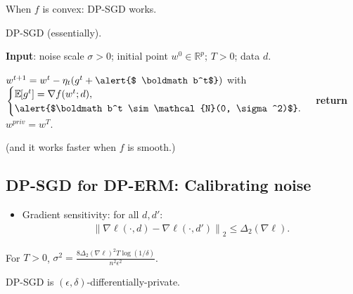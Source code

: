 \documentclass{beamer}
\newcommand{\cN}{\mathcal{N}}
\newcommand{\RR}{\mathbb{R}}
\newcommand{\expec}[2]{\mathbb E_{#1} \hspace{-0.29em} \left[ #2 \right]}
\newcommand{\norm}[1]{\left \lVert #1 \right \rVert}
\DeclareMathOperator*{\argmin}{arg\,min}
\begin{document}
\begin{frame}
  When $f$ is \alert{convex}: DP-SGD works.


  \begin{algorithm}[H]
    \caption{DP-SGD (essentially).}
    \textbf{Input}:
    noise scale $\sigma > 0$;
    initial point $w^0 \in \mathbb{R}^p$;
    $T > 0$;
    data $d$.
    \begin{algorithmic}[1]
      \State $w^{t+1} = w^t - \eta_t ( g^t + \text{\alert{$ \boldmath b^t$}} )$
      with
      $\begin{cases}
        \expec{}{g^t} = \nabla f(w^t; d),  \\
        \text{\alert{$\boldmath  b^t \sim \cN(0, \sigma^2)$}}.
      \end{cases}$
      \EndFor
      \State \textbf{return} $ w^{priv} = w^T$.
    \end{algorithmic}
  \end{algorithm}

  (and it works faster when $f$ is \alert{smooth}.)



\end{frame}

\subsection{DP-SGD for DP-ERM: Calibrating noise}

\begin{frame}
  \begin{itemize}
  \item
    Gradient \alert{sensitivity}: for all $d, d'$:
    \begin{align*}
      \norm{\nabla\ell(\cdot, d) - \nabla\ell(\cdot, d')}_2 \le \Delta_2(\nabla\ell).
    \end{align*}
  \end{itemize}

  \vspace{2em}

  \pause

  \begin{theorem}
    For $T > 0$, $\sigma^2 = \frac{8 \Delta_2(\nabla\ell)^2 T \log(1/\delta)}{n^2\epsilon^2}$. \\
    \begin{center}
      DP-SGD is $(\epsilon,\delta)$-differentially-private.
    \end{center}
  \end{theorem}

  \vspace{1em}

\end{frame}
\end{document}
